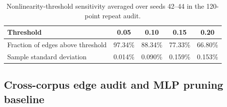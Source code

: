 \documentclass{article}
\begin{document}
\begin{table}[htbp]
\centering
\caption{Nonlinearity-threshold sensitivity averaged over seeds 42--44 in the 120-point repeat audit.}
\label{tab:threshold}
\begin{tabular}{@{}lcccc@{}}
\toprule
Threshold & 0.05 & 0.10 & 0.15 & 0.20 \\
\midrule
Fraction of edges above threshold & 97.34\% & 88.34\% & 77.33\% & 66.80\% \\
Sample standard deviation & 0.014\% & 0.090\% & 0.159\% & 0.153\% \\
\bottomrule
\end{tabular}
\end{table}

\subsection{Cross-corpus edge audit and MLP pruning baseline}

\begin{table}[htbp]
\centering
\caption{Cross-corpus edge audit (Review~\#7, M3). Aggregate B-spline KAN grid-2 edge-function metrics on BabyLM Strict-Small (five seeds, 200-point reconstruction, identical code and settings to the GuppyLM audit), with a shared random-initialized control and the GuppyLM trained reference. Pooled over the six FFN layers and 884,736 edge functions per model. The trained BabyLM statistics match GuppyLM closely despite the different vocabulary (8,192 vs.\ 2,393), corpus, and objective; the random-init control confirms that closed-form approximability is training-induced while near-total top-four fPCA variance is basis-imposed at grid 2 on both corpora.}
\label{tab:babylm-audit}
\end{table}
\end{document}
